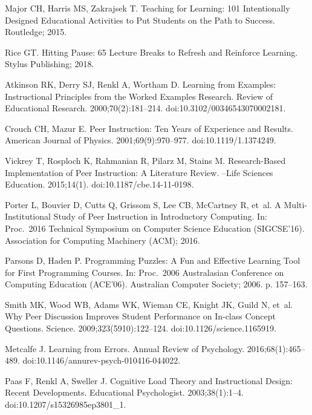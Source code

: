 \documentclass[10pt,letterpaper]{article}
\begin{document}
\begin{thebibliography}{10}
Major CH, Harris MS, Zakrajsek T.
\newblock Teaching for Learning: 101 Intentionally Designed Educational
  Activities to Put Students on the Path to Success.
\newblock Routledge; 2015.

Rice GT.
\newblock Hitting Pause: 65 Lecture Breaks to Refresh and Reinforce Learning.
\newblock Stylus Publishing; 2018.

Atkinson RK, Derry SJ, Renkl A, Wortham D.
\newblock Learning from Examples: Instructional Principles from the Worked
  Examples Research.
\newblock Review of Educational Research. 2000;70(2):181--214.
\newblock doi:{10.3102/00346543070002181}.

Crouch CH, Mazur E.
\newblock Peer Instruction: Ten Years of Experience and Results.
\newblock American Journal of Physics. 2001;69(9):970--977.
\newblock doi:{10.1119/1.1374249}.

Vickrey T, Rosploch K, Rahmanian R, Pilarz M, Stains M.
\newblock Research-Based Implementation of Peer Instruction: A Literature
  Review.
--Life Sciences Education. 2015;14(1).
\newblock doi:{10.1187/cbe.14-11-0198}.

Porter L, Bouvier D, Cutts Q, Grissom S, Lee CB, McCartney R, et~al.
\newblock A Multi-Institutional Study of Peer Instruction in Introductory
  Computing.
\newblock In: Proc.\ 2016 Technical Symposium on Computer Science Education
  ({SIGCSE'16}). Association for Computing Machinery ({ACM}); 2016.

Parsons D, Haden P.
 Programming Puzzles: A Fun and Effective Learning Tool for
  First Programming Courses.
\newblock In: Proc.\ 2006 Australasian Conference on Computing Education
  ({ACE'06}). Australian Computer Society; 2006. p. 157--163.

Smith MK, Wood WB, Adams WK, Wieman CE, Knight JK, Guild N, et~al.
\newblock Why Peer Discussion Improves Student Performance on In-class Concept
  Questions.
\newblock Science. 2009;323(5910):122--124.
\newblock doi:{10.1126/science.1165919}.

Metcalfe J.
\newblock Learning from Errors.
\newblock Annual Review of Psychology. 2016;68(1):465--489.
\newblock doi:{10.1146/annurev-psych-010416-044022}.

Paas F, Renkl A, Sweller J.
\newblock Cognitive Load Theory and Instructional Design: Recent Developments.
\newblock Educational Psychologist. 2003;38(1):1--4.
\newblock doi:{10.1207/s15326985ep3801\_1}.


\end{thebibliography}
\end{document}
